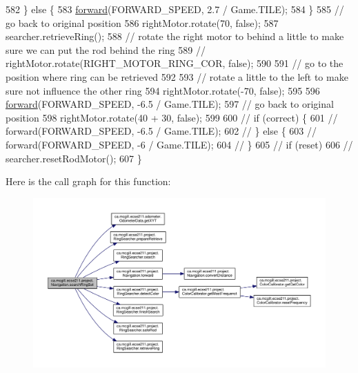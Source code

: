 \begin{DoxyCode}
582     \} \textcolor{keywordflow}{else} \{
583       \hyperlink{classca_1_1mcgill_1_1ecse211_1_1project_1_1_navigation_a7c66610c5b7496ddb35d342ab2cd3f08}{forward}(FORWARD\_SPEED, 2.7 / Game.TILE);
584     \}
585     \textcolor{comment}{// go back to original position}
586     rightMotor.rotate(70, \textcolor{keyword}{false});
587     searcher.retrieveRing();
588     \textcolor{comment}{// rotate the right motor to behind a little to make sure we can put the rod behind the ring}
589     \textcolor{comment}{// rightMotor.rotate(RIGHT\_MOTOR\_RING\_COR, false);}
590 
591     \textcolor{comment}{// go to the position where ring can be retrieved}
592 
593     \textcolor{comment}{// rotate a little to the left to make sure not influence the other ring}
594     rightMotor.rotate(-70, \textcolor{keyword}{false});
595 
596     \hyperlink{classca_1_1mcgill_1_1ecse211_1_1project_1_1_navigation_a7c66610c5b7496ddb35d342ab2cd3f08}{forward}(FORWARD\_SPEED, -6.5 / Game.TILE);
597     \textcolor{comment}{// go back to original position}
598     rightMotor.rotate(40 + 30, \textcolor{keyword}{false});
599 
600     \textcolor{comment}{// if (correct) \{}
601     \textcolor{comment}{// forward(FORWARD\_SPEED, -6.5 / Game.TILE);}
602     \textcolor{comment}{// \} else \{}
603     \textcolor{comment}{// forward(FORWARD\_SPEED, -6 / Game.TILE);}
604     \textcolor{comment}{// \}}
605     \textcolor{comment}{// if (reset)}
606     \textcolor{comment}{// searcher.resetRodMotor();}
607   \}
\end{DoxyCode}
Here is the call graph for this function\+:\nopagebreak
\begin{figure}[H]
\begin{center}
\leavevmode
\includegraphics[width=350pt]{classca_1_1mcgill_1_1ecse211_1_1project_1_1_navigation_a1a808e665b8dd5b8e79b0580724d239c_cgraph}
\end{center}
\end{figure}

